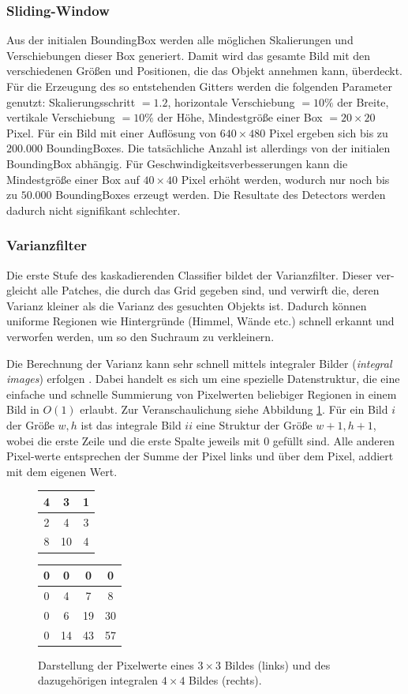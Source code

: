 	\subsubsection{Sliding-Window}
	Aus der initialen BoundingBox werden alle möglichen Skalierungen und Verschiebungen dieser Box generiert. Damit wird das gesamte Bild mit den verschiedenen Größen und Positionen, die das Objekt annehmen kann, überdeckt. Für die Erzeugung des so entstehenden Gitters werden die folgenden Parameter genutzt: Skalierungsschritt $=1.2$, horizontale Verschiebung $=10\%$ der Breite, vertikale Verschiebung $=10\%$ der Höhe, Mindestgröße einer Box $=20\times20$ Pixel. Für ein Bild mit einer Auflösung von $640\times480$ Pixel ergeben sich bis zu $200.000$ BoundingBoxes. Die tatsächliche Anzahl ist allerdings von der initialen BoundingBox abhängig. Für Geschwindigkeitsverbesserungen kann die Mindestgröße einer Box auf $40\times40$ Pixel erhöht werden, wodurch nur noch bis zu $50.000$ BoundingBoxes erzeugt werden. Die Resultate des Detectors werden dadurch nicht signifikant schlechter.

	\subsubsection{Varianzfilter}
	Die erste Stufe des kaskadierenden Classifier bildet der Varianzfilter. Dieser ver-gleicht alle Patches, die durch das Grid gegeben sind, und verwirft die, deren Varianz kleiner als die Varianz des gesuchten Objekts ist. Dadurch können uniforme Regionen wie Hintergründe (Himmel, Wände etc.) schnell erkannt und verworfen werden, um so den Suchraum zu verkleinern.

	Die Berechnung der Varianz kann sehr schnell mittels integraler Bilder (\textit{integral images}) erfolgen \cite{key-6}. Dabei handelt es sich um eine spezielle Datenstruktur, die eine einfache und schnelle Summierung von Pixelwerten beliebiger Regionen in einem Bild in $O(1)$ erlaubt. Zur Veranschaulichung siehe Abbildung \ref{integralImg}. Für ein Bild $i$ der Größe $w,h$ ist das integrale Bild $ii$ eine Struktur der Größe $w+1,h+1$, wobei die erste Zeile und die erste Spalte jeweils mit $0$ gefüllt sind. Alle anderen Pixel-werte entsprechen der Summe der Pixel links und über dem Pixel, addiert mit dem eigenen Wert.

	\begin{figure}[h]
	\centering{}%
	\begin{tabular}{|c|c|c|}
	\hline
	4 & 3 & 1
	\tabularnewline
	\hline
	\hline
	2 & 4 & 3
	\tabularnewline
	\hline
	8 & 10 & 4
	\tabularnewline
	\hline
	\end{tabular} %
	\begin{tabular}{|c|c|c|c|}
	\hline
	0 & 0 & 0 & 0
	\tabularnewline
	\hline
	\hline
	0 & 4 & 7 & 8\tabularnewline
	\hline
	0 & 6 & 19 & 30
	\tabularnewline
	\hline
	0 & 14 & 43 & 57
	\tabularnewline
	\hline
	\end{tabular}\caption{Darstellung der Pixelwerte eines $3\times3$ Bildes (links) und des
	dazugehörigen integralen $4\times4$ Bildes (rechts).}
	\label{integralImg}
	\end{figure}

